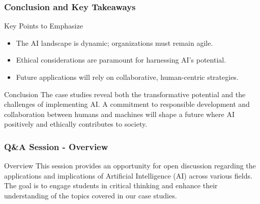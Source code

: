 \documentclass[aspectratio=169]{beamer}
\begin{document}
\begin{frame}[fragile]
    \frametitle{Conclusion and Key Takeaways}
    \begin{block}{Key Points to Emphasize}
        \begin{itemize}
            \item The AI landscape is dynamic; organizations must remain agile.
            \item Ethical considerations are paramount for harnessing AI's potential.
            \item Future applications will rely on collaborative, human-centric strategies.
        \end{itemize}
    \end{block}

    \begin{block}{Conclusion}
        The case studies reveal both the transformative potential and the challenges of implementing AI. A commitment to responsible development and collaboration between humans and machines will shape a future where AI positively and ethically contributes to society.
    \end{block}
\end{frame}

\begin{frame}[fragile]
    \frametitle{Q\&A Session - Overview}
    \begin{block}{Overview}
        This session provides an opportunity for open discussion regarding the applications and implications of Artificial Intelligence (AI) across various fields. 
        The goal is to engage students in critical thinking and enhance their understanding of the topics covered in our case studies.
    \end{block}
\end{frame}
\end{document}
